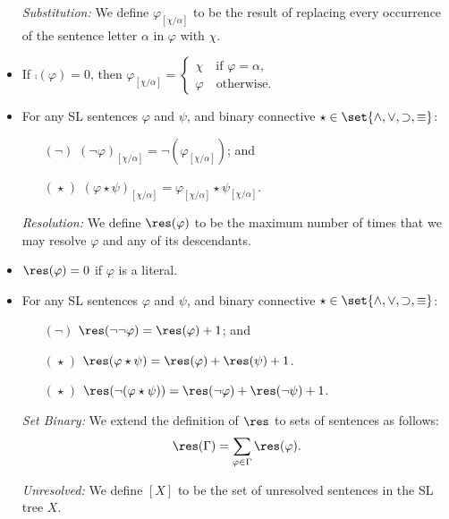 \begin{itemize}
  \item[\it Substitution:] We define $\varphi_{[\chi/\alpha]}$ to be the result of replacing every occurrence of the sentence letter $\alpha$ in $\varphi$ with $\chi$.
      \item If $\comp(\varphi)=0$, then $\varphi_{[\chi/\alpha]}=
        \begin{cases}
          \chi \quad\text{if } \varphi=\alpha,\\
          \varphi \quad\text{otherwise.}
        \end{cases}$
      \item For any SL sentences $\varphi$ and $\psi$, and binary connective $\star\in\set{\wedge,\vee,\supset,\equiv}$: 
    \begin{itemize}
      \item[$(\neg)$] $(\neg\varphi)_{[\chi/\alpha]}=\neg(\varphi_{[\chi/\alpha]})$; and
      \item[$(\hspace{1pt}\star\hspace{1pt})$] $(\varphi\star\psi)_{[\chi/\alpha]}=\varphi_{[\chi/\alpha]}\star\psi_{[\chi/\alpha]}$.
    \end{itemize}
  \item[\it Resolution:] We define $\res(\varphi)$ to be the maximum number of times that we may resolve $\varphi$ and any of its descendants. 
      \item $\res(\varphi)=0$ if $\varphi$ is a literal.
      \item For any SL sentences $\varphi$ and $\psi$, and binary connective $\star\in\set{\wedge,\vee,\supset,\equiv}$: 
        \begin{itemize}
          \item[$(\neg)$] $\res(\neg\neg\varphi)=\res(\varphi)+1$; and
          \item[$(\hspace{1pt}\star\hspace{1pt})$] $\res(\varphi \star \psi)=\res(\varphi)+\res(\psi)+1$.
          \item[$(\hspace{1pt}\star\hspace{1pt})$] $\res(\neg(\varphi \star \psi))=\res(\neg\varphi)+\res(\neg\psi)+1$.
        \end{itemize}
  \item[\it Set Binary:] We extend the definition of $\res$ to sets of sentences as follows:
    $$\res(\Gamma)=\sum\limits_{\varphi\in\Gamma}\res(\varphi).$$
  \item[\it Unresolved:] We define $[X]$ to be the set of unresolved sentences in the SL tree $X$. 

\end{itemize}
